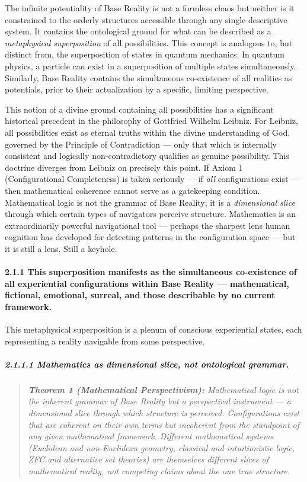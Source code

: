 The infinite potentiality of Base Reality is not a formless chaos but neither is it constrained to the orderly structures accessible through any single descriptive system. It contains the ontological ground for what can be described as a \textit{metaphysical superposition} of all possibilities. This concept is analogous to, but distinct from, the superposition of states in quantum mechanics. In quantum physics, a particle can exist in a superposition of multiple states simultaneously. Similarly, Base Reality contains the simultaneous co-existence of all realities as potentials, prior to their actualization by a specific, limiting perspective.


This notion of a divine ground containing all possibilities has a significant historical precedent in the philosophy of Gottfried Wilhelm Leibniz. For Leibniz, all possibilities exist as eternal truths within the divine understanding of God, governed by the Principle of Contradiction — only that which is internally consistent and logically non-contradictory qualifies as genuine possibility. This doctrine diverges from Leibniz on precisely this point. If Axiom 1 (Configurational Completeness) is taken seriously — if \textit{all} configurations exist — then mathematical coherence cannot serve as a gatekeeping condition. Mathematical logic is not the grammar of Base Reality; it is a \textit{dimensional slice} through which certain types of navigators perceive structure. Mathematics is an extraordinarily powerful navigational tool — perhaps the sharpest lens human cognition has developed for detecting patterns in the configuration space — but it is still a lens. Still a keyhole.


\paragraph*{2.1.1 This superposition manifests as the simultaneous co-existence of all experiential configurations within Base Reality — mathematical, fictional, emotional, surreal, and those describable by no current framework.}


This metaphysical superposition is a plenum of conscious experiential states, each representing a reality navigable from some perspective.


\subparagraph*{2.1.1.1 Mathematics as dimensional slice, not ontological grammar.}


\begin{quote}
\itshape
\textbf{Theorem 1 (Mathematical Perspectivism):} \textit{Mathematical logic is not the inherent grammar of Base Reality but a perspectival instrument — a dimensional slice through which structure is perceived. Configurations exist that are coherent on their own terms but incoherent from the standpoint of any given mathematical framework. Different mathematical systems (Euclidean and non-Euclidean geometry, classical and intuitionistic logic, ZFC and alternative set theories) are themselves different slices of mathematical reality, not competing claims about the one true structure.}
\end{quote}



